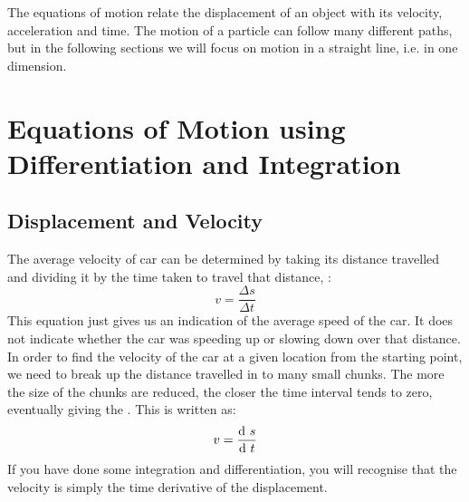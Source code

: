





\addtolength{\topmargin}{-0.7 cm}
\setlength{\columnsep}{22pt}
\nll
The equations of motion relate the displacement of an object with its velocity, acceleration and time. The motion of a particle can follow many different paths, but in the following sections we will focus on motion in a straight line, i.e. in one dimension. 

\section{Equations of Motion using Differentiation and Integration}
\subsection{Displacement and Velocity}
The average velocity  of car can be determined by taking its distance travelled  and dividing it by the time taken to travel that distance, :
\begin{equation}
v = \frac{\Delta s}{\Delta t}   
\end{equation}
This equation just gives us an indication of the average speed of the car. It does not indicate whether the car was speeding up or slowing down over that distance. In order to find the velocity of the car at a given location from the starting point, we need to break up the distance travelled in to many small chunks. The more the size of the chunks are reduced, the closer the time interval tends to zero, eventually giving the . This is written as:
\begin{equation}
v = \frac{\d\ s}{\d\ t} \label{inst_v}
\end{equation}
If you have done some integration and differentiation, you will recognise that the velocity is simply the time derivative of the displacement.
